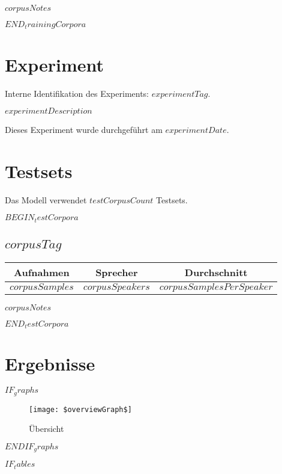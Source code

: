 \documentclass[a4paper,10pt,bibtotoc]{scrartcl}
\begin{document}
$corpusNotes$

$END_trainingCorpora$

\section{Experiment}

Interne Identifikation des Experiments: $experimentTag$.

$experimentDescription$

Dieses Experiment wurde durchgeführt am $experimentDate$.

\section{Testsets}
\label{sec:Testsets}

Das Modell verwendet $testCorpusCount$ Testsets.

$BEGIN_testCorpora$
\subsection{$corpusTag$}
\label{sec:$SAVE_corpusTag$}

\begin{tabular}{|c|c|c|}
\hline
{\bf Aufnahmen} & {\bf Sprecher} & {\bf Durchschnitt} \\
\hline
$corpusSamples$ & $corpusSpeakers$ & $corpusSamplesPerSpeaker$ \\
\hline
\end{tabular}

$corpusNotes$

$END_testCorpora$


\section{Ergebnisse}

$IF_graphs$
\begin{figure}[h]
 \centering
 \texttt{[image: \$overviewGraph\$]}
 \caption{Übersicht}
 \label{fig:GraphOverview}
\end{figure}
$ENDIF_graphs$

$IF_tables$
\end{document}
